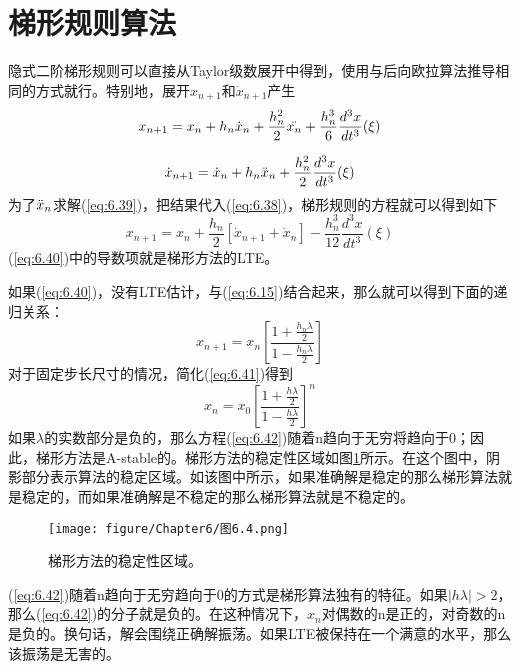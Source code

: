 \section{梯形规则算法}
隐式二阶梯形规则可以直接从Taylor级数展开中得到，使用与后向欧拉算法推导相同的方式就行。特别地，展开$x_{n+1}$和$\dot{x}_{n+1}$产生
\begin{equation}
    x_{n+1} = x_n + h_n\dot{x}_n + \frac{h^2_n}{2}\Ddot{x_n} + \frac{h^3_n}{6}\frac{d^3x}{dt^3}(\xi)
    \label{eq:6.38}
\end{equation}

\begin{equation}
    \dot{x}_{n+1} = \dot{x}_n + h_n\Ddot{x}_n + \frac{h^2_n}{2}\frac{d^3x}{dt^3}(\xi)
    \label{eq:6.39}
\end{equation}
为了$\Ddot{x}_n$求解(\ref{eq:6.39})，把结果代入(\ref{eq:6.38})，梯形规则的方程就可以得到如下
\begin{equation}
    x_{n+1} = x_n + \frac{h_n}{2}[\dot{x}_{n+1}+\dot{x}_n] - \frac{h^3_n}{12}\frac{d^3x}{dt^3}(\xi)
    \label{eq:6.40}
\end{equation}
(\ref{eq:6.40})中的导数项就是梯形方法的LTE。

如果(\ref{eq:6.40})，没有LTE估计，与(\ref{eq:6.15})结合起来，那么就可以得到下面的递归关系：
\begin{equation}
    x_{n+1} = x_n[\frac{1+\frac{h_n\lambda}{2}}{1-\frac{h_n\lambda}{2}}]
    \label{eq:6.41}
\end{equation}
对于固定步长尺寸的情况，简化(\ref{eq:6.41})得到
\begin{equation}
    x_n = x_0[\frac{1+\frac{h\lambda}{2}}{1-\frac{h\lambda}{2}}]^n
    \label{eq:6.42}
\end{equation}
如果$\lambda$的实数部分是负的，那么方程(\ref{eq:6.42})随着n趋向于无穷将趋向于0；因此，梯形方法是A-stable的。梯形方法的稳定性区域如图\ref{图6.4}所示。在这个图中，阴影部分表示算法的稳定区域。如该图中所示，如果准确解是稳定的那么梯形算法就是稳定的，而如果准确解是不稳定的那么梯形算法就是不稳定的。
\begin{figure}[htbp]
\small
    \centering
    \texttt{[image: figure/Chapter6/图6.4.png]}
    \caption{梯形方法的稳定性区域。}
    \label{图6.4}
\end{figure}

(\ref{eq:6.42})随着n趋向于无穷趋向于0的方式是梯形算法独有的特征。如果$|h\lambda|>2$，那么(\ref{eq:6.42})的分子就是负的。在这种情况下，$x_n$对偶数的n是正的，对奇数的n是负的。换句话，解会围绕正确解振荡。如果LTE被保持在一个满意的水平，那么该振荡是无害的。


